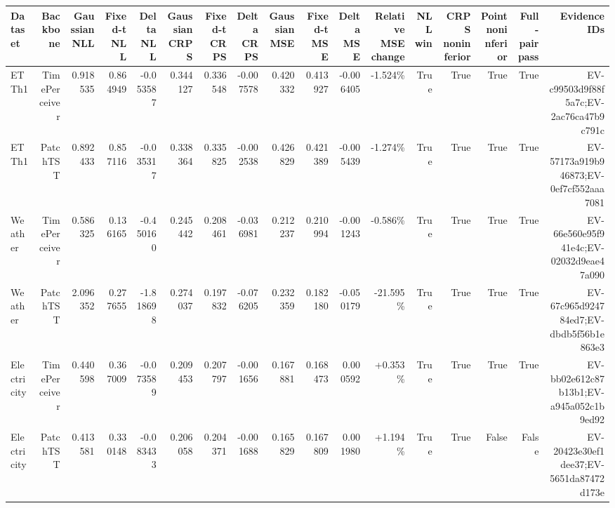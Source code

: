 \begin{tabular}{lrrrrrrrrrrrrrrrr}
\hline
Dataset & Backbone & Gaussian NLL & Fixed-t NLL & Delta NLL & Gaussian CRPS & Fixed-t CRPS & Delta CRPS & Gaussian MSE & Fixed-t MSE & Delta MSE & Relative MSE change & NLL win & CRPS noninferior & Point noninferior & Full-pair pass & Evidence IDs \\
\hline
ETTh1 & TimePerceiver & 0.918535 & 0.864949 & -0.053587 & 0.344127 & 0.336548 & -0.007578 & 0.420332 & 0.413927 & -0.006405 & -1.524\% & True & True & True & True & EV-c99503d9f88f5a7c;EV-2ac76ca47b9c791c \\
ETTh1 & PatchTST & 0.892433 & 0.857116 & -0.035317 & 0.338364 & 0.335825 & -0.002538 & 0.426829 & 0.421389 & -0.005439 & -1.274\% & True & True & True & True & EV-57173a919b946873;EV-0ef7cf552aaa7081 \\
Weather & TimePerceiver & 0.586325 & 0.136165 & -0.450160 & 0.245442 & 0.208461 & -0.036981 & 0.212237 & 0.210994 & -0.001243 & -0.586\% & True & True & True & True & EV-66e560e95f941e4c;EV-02032d9eae47a090 \\
Weather & PatchTST & 2.096352 & 0.277655 & -1.818698 & 0.274037 & 0.197832 & -0.076205 & 0.232359 & 0.182180 & -0.050179 & -21.595\% & True & True & True & True & EV-67c965d924784ed7;EV-dbdb5f56b1e863e3 \\
Electricity & TimePerceiver & 0.440598 & 0.367009 & -0.073589 & 0.209453 & 0.207797 & -0.001656 & 0.167881 & 0.168473 & 0.000592 & +0.353\% & True & True & True & True & EV-bb02e612c87b13b1;EV-a945a052c1b9ed92 \\
Electricity & PatchTST & 0.413581 & 0.330148 & -0.083433 & 0.206058 & 0.204371 & -0.001688 & 0.165829 & 0.167809 & 0.001980 & +1.194\% & True & True & False & False & EV-20423e30ef1dee37;EV-5651da87472d173e \\
\hline
\end{tabular}
